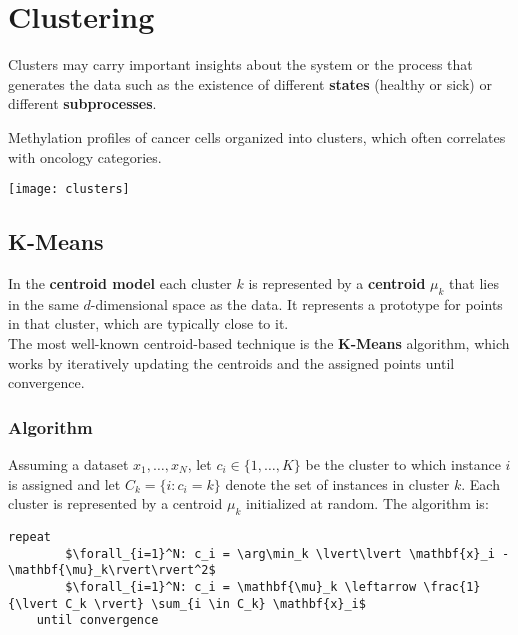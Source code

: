 \newpage
\section{Clustering}
Clusters may carry important insights about the system or the process that generates the data such as the existence of different \textbf{states} (healthy or sick) or different \textbf{subprocesses}.

\begin{example}
	Methylation profiles of cancer cells organized into clusters, which often correlates with oncology categories. 
	
	\begin{center}
		\texttt{[image: clusters]}
	\end{center}
\end{example}

\subsection{K-Means}
In the \textbf{centroid model} each cluster $k$ is represented by a \textbf{centroid} $\mu_k$ that lies in the same $d$-dimensional space as the data. It represents a prototype for points in that cluster, which are typically close to it.\\
The most well-known centroid-based technique is the \textbf{K-Means} algorithm, which works by iteratively updating the centroids and the assigned points until convergence.
\subsubsection{Algorithm}
Assuming a dataset $x_1, \ldots, x_N$, let $c_i \in \{1, \ldots, K\}$ be the cluster to which instance $i$ is assigned and let $C_k = \{i: c_i = k\}$ denote the set of instances in cluster $k$. Each cluster is represented by a centroid $\mu_k$ initialized at random. The algorithm is:
\begin{lstlisting}[mathescape=true]
	repeat
		$\forall_{i=1}^N: c_i = \arg\min_k \lvert\lvert \mathbf{x}_i - \mathbf{\mu}_k\rvert\rvert^2$
		$\forall_{i=1}^N: c_i = \mathbf{\mu}_k \leftarrow \frac{1}{\lvert C_k \rvert} \sum_{i \in C_k} \mathbf{x}_i$
	until convergence
\end{lstlisting}
